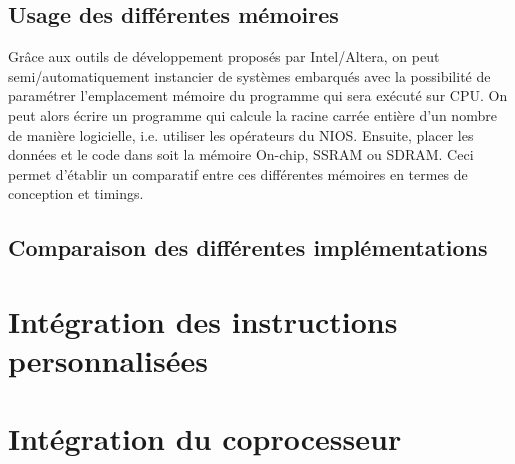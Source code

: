 \documentclass[12pt,a4paper]{article}
\begin{document}
\subsection{Usage des différentes mémoires}
Grâce aux outils de développement proposés par Intel/Altera, on peut semi/automatiquement instancier de systèmes embarqués avec la possibilité de paramétrer l'emplacement mémoire du programme qui sera exécuté sur CPU. On peut alors écrire un programme qui calcule la racine carrée entière d'un nombre de manière logicielle, i.e. utiliser les opérateurs du NIOS. Ensuite, placer les données et le code dans soit la mémoire On-chip, SSRAM ou SDRAM. Ceci permet d'établir un comparatif entre ces différentes mémoires en termes de conception et timings. 


\subsection{Comparaison des différentes implémentations}


\section{Intégration des instructions personnalisées}
\section{Intégration du coprocesseur}
\end{document}
